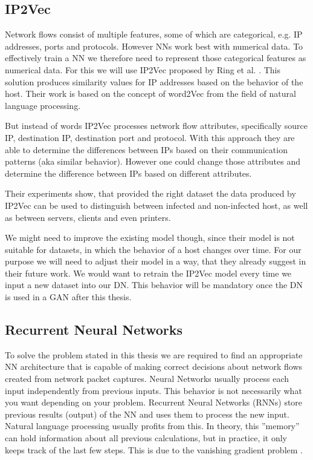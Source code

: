 \documentclass[
	ngerman,
	ruledheaders=section,%
	class=report,%
	thesis={type=bachelor},%
	accentcolor=9c,%
	custommargins=true,%
	marginpar=false,%
	parskip=half-,%
	fontsize=11pt,%
]{tudapub}
\begin{document}
\subsection{IP2Vec}

Network flows consist of multiple features, some of which are categorical, e.g. IP addresses, ports and protocols.
However NNs work best with numerical data.
To effectively train a NN we therefore need to represent those categorical features as numerical data.
For this we will use IP2Vec proposed by Ring et al. \cite{ringIP2VecLearningSimilarities2017}.
This solution produces similarity values for IP addresses based on the behavior of the host.
Their work is based on the concept of word2Vec from the field of natural language processing.

But instead of words IP2Vec processes network flow attributes,
specifically source IP, destination IP, destination port and protocol.
With this approach they are able to determine the differences between IPs based on their communication patterns (aka similar behavior).
However one could change those attributes and determine the difference between IPs based on different attributes.

Their experiments show, that provided the right dataset the data produced by IP2Vec can be used to distinguish between infected and non-infected host, as well as between servers, clients and even printers.

We might need to improve the existing model though, since their model is not suitable for datasets, in which the behavior of a host changes over time.
For our purpose we will need to adjust their model in a way, that they already suggest in their future work.
We would want to retrain the IP2Vec model every time we input a new dataset into our DN.
This behavior will be mandatory once the DN is used in a GAN after this thesis.

\subsection{Recurrent Neural Networks}

To solve the problem stated in this thesis we are required to find an appropriate NN architecture
that is capable of making correct decisions about network flows created from network packet captures.
Neural Networks usually process each input independently from previous inputs.
This behavior is not necessarily what you want depending on your problem.
Recurrent Neural Networks (RNNs) store previous results (output) of the NN and uses them to process the new input.
Natural language processing usually profits from this.
In theory, this ''memory'' can hold information about all previous calculations,
but in practice, it only keeps track of the last few steps.
This is due to the vanishing gradient problem \cite{hochreiterLongShortTermMemory1997}.
\end{document}
